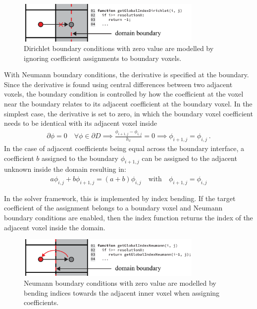 \begin{figure}[h]
\centering
\includegraphics[width=0.8\textwidth]{04_pn_method/figures/fig_bc_dirichlet.pdf}
\caption{Dirichlet boundary conditions with zero value are modelled by ignoring coefficient assignments to boundary voxels.}
\label{fig:pn_bc_dirichlet}
\end{figure}

With Neumann boundary conditions, the derivative is specified at the boundary. Since the derivative is found using central differences between two adjacent voxels, the boundary condition is controlled by how the coefficient at the voxel near the boundary relates to its adjacent coefficient at the boundary voxel. In the simplest case, the derivative is set to zero, in which the boundary voxel coefficient needs to be identical with its adjacent voxel inside
\begin{align*}
\partial\phi=0\quad\forall\phi\in\partial D
\implies
\frac{\phi_{i+1,j}-\phi_{i,j}}{h_x} = 0
\implies
\phi_{i+1,j}=\phi_{i,j}
\ .
\end{align*}
In the case of adjacent coefficients being equal across the boundary interface, a coefficient $b$ assigned to the boundary $\phi_{i+1,j}$ can be assigned to the adjacent unknown inside the domain resulting in:
\begin{align}
a\phi_{i,j} + b\phi_{i+1,j} = \left(a+b\right)\phi_{i,j}
\quad \text{with}\quad \phi_{i+1,j}=\phi_{i,j}
\end{align}

In the solver framework, this is implemented by index bending. If the target coefficient of the assignment belongs to a boundary voxel and Neumann boundary conditions are enabled, then the index function returns the index of the adjacent voxel inside the domain.

\begin{figure}[h]
\centering
\includegraphics[width=0.8\textwidth]{04_pn_method/figures/fig_bc_neumann.pdf}
\caption{Neumann boundary conditions with zero value are modelled by bending indices towards the adjacent inner voxel when assigning coefficients.}
\label{fig:pn_bc_neumann}
\end{figure}

